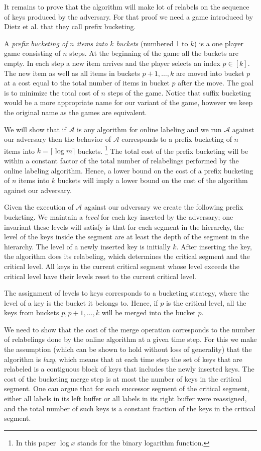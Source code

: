 \documentclass[11pt]{article}
\newcommand{\A}{\mathcal{A}}
\begin{document}
It remains to prove that the algorithm will make lot of relabels on the sequence
of keys produced by the adversary.
For that proof we need a game introduced by Dietz et al. \cite{DSZ04} that they
call prefix bucketing.

A \emph{prefix bucketing of $n$ items into $k$  buckets} (numbered 1 to $k$) is a one player game consisting of $n$ steps.
At the beginning of the game
all the buckets are empty. In each step a new item arrives and the player selects an index $p \in [k]$.
The new item as well as all items in buckets $p+1,\ldots,k$ are moved into bucket $p$ at a cost equal to the
total number of items in bucket $p$ after the move.  The goal is to minimize the total cost of $n$ steps
of the game.
Notice that suffix bucketing would be a more appropriate name for our variant of the game, however we keep the original name as the games are equivalent.

We will show that if $\A$ is any algorithm for online labeling and we run $\A$ against our adversary then
the behavior of $\A$ corresponds to a prefix bucketing of $n$ items into $k=\lceil \log m \rceil$ buckets.%
\footnote{In this paper $\log x$ stands for the binary logarithm function.}
The total cost of the prefix bucketing will be within a constant factor of  the total number of relabelings
performed by the online labeling algorithm. Hence, a lower bound on the cost of a prefix bucketing of $n$ items into $k$
buckets will imply a lower bound on the cost of the algorithm against our adversary.

Given the execution of $\A$ against our adversary we create
the following prefix bucketing.  We maintain a \emph{level} for each key inserted by the adversary; one invariant
these levels will satisfy is that for each segment in the hierarchy, the level of the keys inside
the segment are at least the depth of the segment in the hierarchy.
The level of a newly inserted key is initially $k$. After inserting the key, the algorithm
does its relabeling, which determines the critical segment and the critical level.
All keys in the current critical segment whose level exceeds the critical level have their levels
reset to the current critical level.

The assignment of levels to keys corresponds to a bucketing strategy, where the level of a key is the bucket
it belongs to.   Hence, if $p$ is the critical level, all the keys from
buckets $p,p+1,\dotsc,k$ will be merged into the bucket $p$.

We need to show that
the cost of the merge operation corresponds to the number of relabelings done by the online algorithm
at a given time step.  For this we  make the assumption (which can be shown to hold without loss of generality) that the algorithm is \emph{lazy}, which means
that at each time step the set of keys that are relabeled is a contiguous block of keys that includes
the newly inserted keys.    The cost of the bucketing merge step is at most the number of keys in
the critical segment.  One can argue that for each successor segment of the critical segment, either all labels in its left buffer
or all labels in its right buffer were reassigned, and the total number of such keys is a constant fraction of the keys
in the critical segment.
\end{document}
